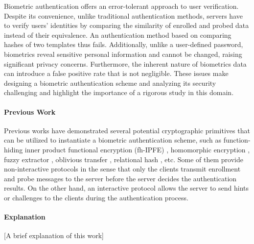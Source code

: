 


Biometric authentication offers an error-tolerant approach to user verification. Despite its convenience, unlike traditional authentication methods, servers have to verify users' identities by comparing the similarity of enrolled and probed data instead of their equivalence. An authentication method based on comparing hashes of two templates thus fails. Additionally, unlike a user-defined password, biometrics reveal sensitive personal information and cannot be changed, raising significant privacy concerns. Furthermore, the inherent nature of biometrics data can introduce a false positive rate that is not negligible. These issues make designing a biometric authentication scheme and analyzing its security challenging and highlight the importance of a rigorous study in this domain.

\paragraph{Previous Work}
Previous works have demonstrated several potential cryptographic primitives that can be utilized to instantiate a biometric authentication scheme, such as function-hiding inner product functional encryption (fh-IPFE) \cite{cryptoeprint:2016/440, cryptoeprint:2018/1214, 10.1007/978-3-030-90567-5_33, 10.1145/3488932.3497754, cryptoeprint:2023/481}, homomorphic encryption \cite{10.1007/978-3-642-01957-9_7, 10.1007/978-3-642-40588-4_5, pradel2021privacypreservingbiometricmatchingusing}, fuzzy extractor \cite{10.1145/1030083.1030096, 7980010}, oblivious transfer \cite{cryptoeprint:2012/586}, relational hash \cite{cryptoeprint:2014/394}, etc. Some of them provide non-interactive protocols in the sense that only the clients transmit enrollment and probe messages to the server before the server decides the authentication results. On the other hand, an interactive protocol allows the server to send hints or challenges to the clients during the authentication process.

\paragraph{Explanation}

[A brief explanation of this work]

